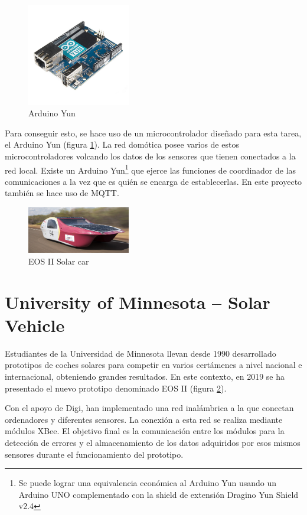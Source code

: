 \begin{figure}
	\centering
	\includegraphics[width=0.4\textwidth]{Figuras/EArte8.png}
	\caption{Arduino Yun}
	\label{fig:EArte8}
\end{figure}




Para conseguir esto, se hace uso de un microcontrolador diseñado para esta tarea, el Arduino Yun (figura \ref{fig:EArte8}). La red domótica posee varios de estos microcontroladores volcando los datos de los sensores que tienen conectados a la red local. Existe un Arduino Yun\footnote{Se puede lograr una equivalencia económica al Arduino Yun usando un Arduino UNO complementado con la shield de extensión Dragino Yun Shield v2.4} que ejerce las funciones de coordinador de las comunicaciones a la vez que es quién se encarga de establecerlas. En este proyecto también se hace uso de MQTT.

\begin{figure}
	\centering
	\includegraphics[width=0.4\textwidth]{Figuras/EArte3.png}
	\caption{EOS II Solar car}
	\label{fig:EArte3}
\end{figure}

\section{University of Minnesota – Solar Vehicle \cite{UM:SV}}

Estudiantes de la Universidad de Minnesota llevan desde 1990 desarrollado prototipos de coches solares para competir en varios certámenes a nivel nacional e internacional, obteniendo grandes resultados. En este contexto, en 2019 se ha presentado el nuevo prototipo denominado EOS II (figura \ref{fig:EArte3}). 


Con el apoyo de Digi, han implementado una red inalámbrica a la que conectan ordenadores y diferentes sensores. La conexión a esta red se realiza mediante módulos XBee. El objetivo final es la comunicación entre los módulos para la detección de errores y el almacenamiento de los datos adquiridos por esos mismos sensores durante el funcionamiento del prototipo.